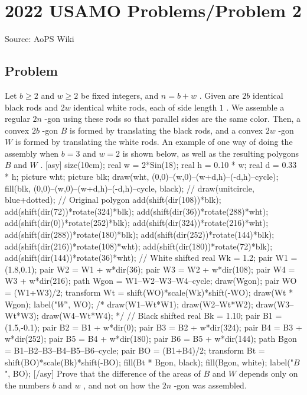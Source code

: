 \documentclass[12pt]{article}
\begin{document}
\section*{{2022 USAMO Problems/Problem 2}}
Source: AoPS Wiki

\subsection*{Problem}
Let $b\geq2$ and $w\geq2$ be fixed integers, and $n=b+w$ . Given are $2b$ identical black rods and $2w$ identical white rods, each of side length $1$ . We assemble a regular $2n$ -gon using these rods so that parallel sides are the same color. Then, a convex $2b$ -gon $B$ is formed by translating the black rods, and a convex $2w$ -gon $W$ is formed by translating the white rods. An example of one way of doing the assembly when $b=3$ and $w=2$ is shown below, as well as the resulting polygons $B$ and $W$ . [asy] size(10cm); real w = 2*Sin(18); real h = 0.10 * w; real d = 0.33 * h; picture wht; picture blk; draw(wht, (0,0)--(w,0)--(w+d,h)--(-d,h)--cycle); fill(blk, (0,0)--(w,0)--(w+d,h)--(-d,h)--cycle, black); // draw(unitcircle, blue+dotted); // Original polygon add(shift(dir(108))*blk); add(shift(dir(72))*rotate(324)*blk); add(shift(dir(36))*rotate(288)*wht); add(shift(dir(0))*rotate(252)*blk); add(shift(dir(324))*rotate(216)*wht); add(shift(dir(288))*rotate(180)*blk); add(shift(dir(252))*rotate(144)*blk); add(shift(dir(216))*rotate(108)*wht); add(shift(dir(180))*rotate(72)*blk); add(shift(dir(144))*rotate(36)*wht); // White shifted real Wk = 1.2; pair W1 = (1.8,0.1); pair W2 = W1 + w*dir(36); pair W3 = W2 + w*dir(108); pair W4 = W3 + w*dir(216); path Wgon = W1--W2--W3--W4--cycle; draw(Wgon); pair WO = (W1+W3)/2; transform Wt = shift(WO)*scale(Wk)*shift(-WO); draw(Wt * Wgon); label("$W$", WO); /* draw(W1--Wt*W1); draw(W2--Wt*W2); draw(W3--Wt*W3); draw(W4--Wt*W4); */ // Black shifted real Bk = 1.10; pair B1 = (1.5,-0.1); pair B2 = B1 + w*dir(0); pair B3 = B2 + w*dir(324); pair B4 = B3 + w*dir(252); pair B5 = B4 + w*dir(180); pair B6 = B5 + w*dir(144); path Bgon = B1--B2--B3--B4--B5--B6--cycle; pair BO = (B1+B4)/2; transform Bt = shift(BO)*scale(Bk)*shift(-BO); fill(Bt * Bgon, black); fill(Bgon, white); label("$B$", BO); [/asy] Prove that the difference of the areas of $B$ and $W$ depends only on the numbers $b$ and $w$ , and not on how the $2n$ -gon was assembled.
\end{document}
